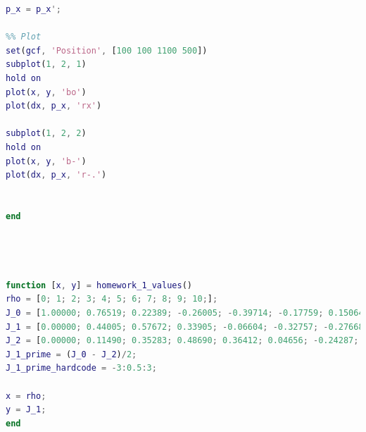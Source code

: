 \documentclass[12pt]{article}
\begin{document}
\begin{lstlisting}[language=Matlab, caption=Cubic Spline Program]
p_x = p_x';

%% Plot
set(gcf, 'Position', [100 100 1100 500])
subplot(1, 2, 1)
hold on
plot(x, y, 'bo')
plot(dx, p_x, 'rx')

subplot(1, 2, 2)
hold on
plot(x, y, 'b-')
plot(dx, p_x, 'r-.')


end




function [x, y] = homework_1_values()
rho = [0; 1; 2; 3; 4; 5; 6; 7; 8; 9; 10;];
J_0 = [1.00000; 0.76519; 0.22389; -0.26005; -0.39714; -0.17759; 0.15064; 0.30007; 0.17165; -0.09033; -0.24593];
J_1 = [0.00000; 0.44005; 0.57672; 0.33905; -0.06604; -0.32757; -0.27668; -0.00468; 0.23463; 0.24531; 0.04347;];
J_2 = [0.00000; 0.11490; 0.35283; 0.48690; 0.36412; 0.04656; -0.24287; -0.30141; -0.11299; 0.14484; 0.25463;];
J_1_prime = (J_0 - J_2)/2;
J_1_prime_hardcode = -3:0.5:3;

x = rho;
y = J_1;
end
\end{lstlisting}
\end{document}

